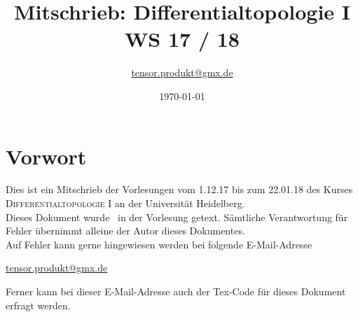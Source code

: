 \documentclass[12pt]{book}
\date{\today}
\author{\href{mailto:tensor.produkt@gmx.de}{tensor.produkt@gmx.de}}
\begin{document}
\title{Mitschrieb: Differentialtopologie I\\
WS 17 / 18}
\maketitle
\section*{Vorwort}
Dies ist ein Mitschrieb der Vorlesungen vom 1.12.17 bis zum 22.01.18 des Kurses \textsc{Differentialtopologie I} an der Universität Heidelberg.\\
Dieses Dokument wurde \grqq\ in der Vorlesung getext. Sämtliche Verantwortung für Fehler übernimmt alleine der Autor dieses Dokumentes.\\
Auf Fehler kann gerne hingewiesen werden bei folgende E-Mail-Adresse
\begin{center}
	\href{mailto:tensor.produkt@gmx.de}{tensor.produkt@gmx.de}
\end{center}
Ferner kann bei dieser E-Mail-Adresse auch der Tex-Code für dieses Dokument erfragt werden.

\setcounter{tocdepth}{1}
\tableofcontents


















\printindex
\end{document}
